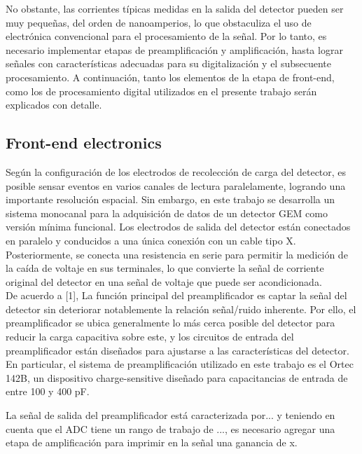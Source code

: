 \documentclass[]{book}
\begin{document}
\noindent No obstante, las corrientes típicas medidas en la salida del detector pueden ser muy pequeñas, del orden de nanoamperios, lo que obstaculiza el uso de electrónica convencional para el procesamiento de la señal. Por lo tanto, es necesario implementar etapas de preamplificación y amplificación, hasta lograr señales con características adecuadas para su digitalización y el subsecuente procesamiento. A continuación, tanto los elementos de la etapa de front-end, como los de procesamiento digital utilizados en el presente trabajo serán explicados con detalle.

\subsection*{Front-end electronics}

\noindent Según la configuración de los electrodos de recolección de carga del detector, es posible sensar eventos en varios canales de lectura paralelamente, logrando una importante resolución espacial. Sin embargo, en este trabajo se desarrolla un sistema monocanal para la adquisición de datos de un detector GEM como versión mínima funcional. Los electrodos de salida del detector están conectados en paralelo y conducidos a una única conexión con un cable tipo X. Posteriormente, se conecta una resistencia en serie para permitir la medición de la caída de voltaje en sus terminales, lo que convierte la señal de corriente original del detector en una señal de voltaje que puede ser acondicionada.\\


\noindent De acuerdo a [1], La función principal del preamplificador es captar la señal del detector sin deteriorar notablemente la relación señal/ruido inherente. Por ello, el preamplificador se ubica generalmente lo más cerca posible del detector para reducir la carga capacitiva sobre este, y los circuitos de entrada del preamplificador están diseñados para ajustarse a las características del detector. En particular, el sistema de preamplificación utilizado en este trabajo es el Ortec 142B, un dispositivo charge-sensitive diseñado para capacitancias de entrada de entre 100 y 400 pF. %

La señal de salida del preamplificador está caracterizada por... y teniendo en cuenta que el ADC tiene un rango de trabajo de ..., es necesario agregar una etapa de amplificación para imprimir en la señal una ganancia de x.\\
\end{document}
